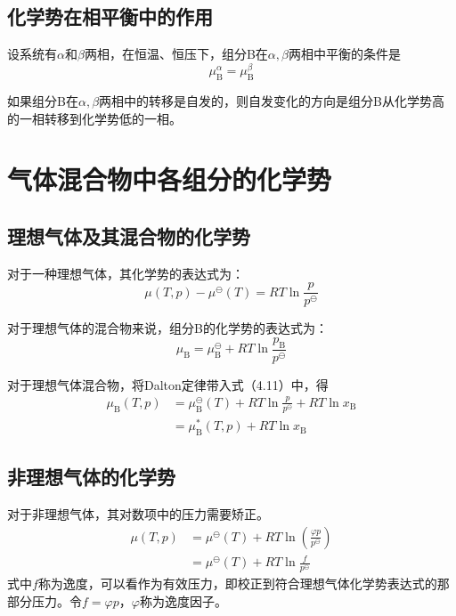 \documentclass[lang=cn,newtx,11pt,scheme=chinese]{elegantbook}
\begin{document}
\subsection{化学势在相平衡中的作用}
设系统有$\alpha$和$\beta$两相，在恒温、恒压下，组分B在$\alpha,\beta$两相中平衡的条件是
\begin{equation}
	\mu^\alpha_\mathrm{B} = \mu^\beta_\mathrm{B}
\end{equation}

如果组分B在$\alpha,\beta$两相中的转移是自发的，则自发变化的方向是组分B从化学势高的一相转移到化学势低的一相。

\section{气体混合物中各组分的化学势}
\subsection{理想气体及其混合物的化学势}
对于一种理想气体，其化学势的表达式为：
\begin{equation}
	\mu (T,p)-\mu ^\ominus (T)=RT\ln \frac{p}{p^\ominus } 
\end{equation}

对于理想气体的混合物来说，组分B的化学势的表达式为：
\begin{equation}
	\mu _\mathrm{B}=\mu ^\ominus _\mathrm{B}+RT\ln \frac{p_\mathrm{B} }{p^\ominus }   
\end{equation}

对于理想气体混合物，将Dalton定律带入式（4.11）中，得
\begin{equation}
	\begin{aligned}
		\mu_\mathrm{B}(T,p) &=\mu^\ominus_\mathrm{B}(T)+RT\ln \frac{p}{p^\ominus}+RT\ln x_\mathrm{B} \\
		&= \mu^*_\mathrm{B}(T,p)+RT\ln x_\mathrm{B}
	\end{aligned}
\end{equation}

\subsection{非理想气体的化学势}

对于非理想气体，其对数项中的压力需要矫正。
\begin{equation}
	\begin{aligned}
		\mu(T,p) &=\mu^\ominus(T)+RT\ln \left(\frac{\varphi p}{p^\ominus}\right) \\
		&= \mu^\ominus(T)+RT \ln \frac{f}{p^\ominus}
	\end{aligned}
\end{equation}
式中$f$称为逸度，可以看作为有效压力，即校正到符合理想气体化学势表达式的那部分压力。令$f=\varphi p$，$\varphi$称为逸度因子。
\end{document}
